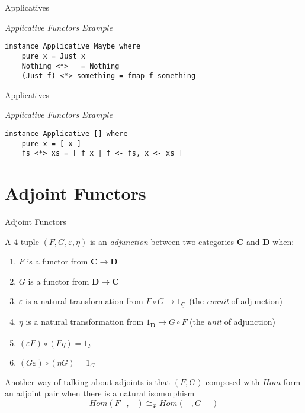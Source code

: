 \documentclass[10pt]{beamer}
\newcommand{\Cat}[1]{\ensuremath{\underline{\mathbf{#1}}}}
\theoremstyle{definition}
\theoremstyle{remark}
\numberwithin{equation}{section}
\begin{document}
\begin{frame}[fragile]{Applicatives}

  \emph{Applicative Functors Example}

  \begin{lstlisting}[frame=single]
instance Applicative Maybe where
    pure x = Just x
    Nothing <*> _ = Nothing
    (Just f) <*> something = fmap f something
  \end{lstlisting}

\end{frame}

\begin{frame}[fragile]{Applicatives}

  \emph{Applicative Functors Example}

  \begin{lstlisting}[frame=single]
instance Applicative [] where
    pure x = [ x ]
    fs <*> xs = [ f x | f <- fs, x <- xs ]
  \end{lstlisting}

\end{frame}


\section{Adjoint Functors}

\begin{frame}[fragile]{Adjoint Functors}

  A 4-tuple $(F,G,\varepsilon,\eta)$ is an \emph{adjunction} between two categories $\Cat{C}$ and $\Cat{D}$
  when:
  \begin{enumerate}
    \item $F$ is a functor from $\Cat{C}\rightarrow\Cat{D}$
    \item $G$ is a functor from $\Cat{D}\rightarrow\Cat{C}$
    \item $\varepsilon$ is a natural transformation from $F\circ G \rightarrow 1_{\Cat{C}}$ (the \emph{counit} of adjunction)
    \item $\eta$ is a natural transformation from $1_{\Cat{D}} \rightarrow G\circ F$ (the \emph{unit} of adjunction)
    \item $(\varepsilon F)\circ(F \eta) = 1_{F}$
    \item $(G \varepsilon)\circ(\eta G) = 1_{G}$
  \end{enumerate}

  Another way of talking about adjoints is that $(F,G)$ composed with $Hom$ form an adjoint pair
  when there is a natural isomorphism
  \[
  Hom(F-,-) \cong_{\Phi} Hom(-,G-)
  \]
  
\end{frame}
\end{document}
